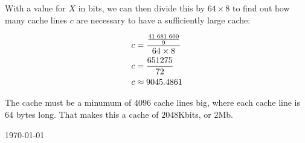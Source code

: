 \documentclass[fontsize=11pt, paper=a4, titlepage]{article}
\begin{document}
\begin{enumerate}[a)]
With a value for $X$ in bits, we can then divide this by $64\times 8$ to find out how many cache lines $c$ are necessary to have a sufficiently large cache:

    \begin{align*}
        c &= \frac{\frac{41\thickspace 681\thickspace 600}{9}}{64\times 8} \\
        c &= \frac{651 275}{72} \\
        c &\approx 9045.4861
    \end{align*}

The cache must be a minumum of $4096$ cache lines big, where each cache line is
$64$ bytes long. That makes this a cache of $2048$Kbits, or $2$Mb.

\end{enumerate}

\vfill
\hfill \large{\today}
\end{document}
